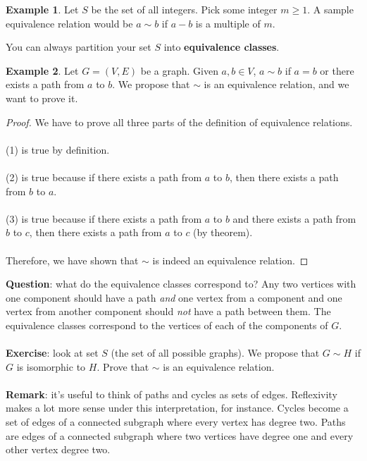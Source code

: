 \documentclass[]{article}
\theoremstyle{definition}
\newtheorem{ex}{Example}[section]
\begin{document}
				\begin{ex}
					Let $S$ be the set of all integers. Pick some integer $m \ge 1$. A sample equivalence relation would be $a \sim b$ if $a - b$ is a multiple of $m$.
				\end{ex}

				You can always partition your set $S$ into \textbf{equivalence classes}.

				\begin{ex}
					Let $G = (V, E)$ be a graph. Given $a, b \in V$, $a \sim b$ if $a = b$ or there exists a path from $a$ to $b$. We propose that $\sim$ is an equivalence relation, and we want to prove it.
					\begin{proof}
						We have to prove all three parts of the definition of equivalence relations.
						\\ \\
						(1) is true by definition.
						\\ \\
						(2) is true because if there exists a path from $a$ to $b$, then there exists a path from $b$ to $a$.
						\\ \\
						(3) is true because if there exists a path from $a$ to $b$ and there exists a path from $b$ to $c$, then there exists a path from $a$ to $c$ (by theorem).
						\\ \\
						Therefore, we have shown that $\sim$ is indeed an equivalence relation.
					\end{proof}
				\end{ex}

				\textbf{Question}: what do the equivalence classes correspond to? Any two vertices with one component should have a path \emph{and} one vertex from a component and one vertex from another component should \emph{not} have a path between them. The equivalence classes correspond to the vertices of each of the components of $G$.
				\\ \\
				\textbf{Exercise}: look at set $S$ (the set of all possible graphs). We propose that $G \sim H$ if $G$ is isomorphic to $H$. Prove that $\sim$ is an equivalence relation.
				\\ \\
				\textbf{Remark}: it's useful to think of paths and cycles as sets of edges. Reflexivity makes a lot more sense under this interpretation, for instance. Cycles become a set of edges of a connected subgraph where every vertex has degree two. Paths are edges of a connected subgraph where two vertices have degree one and every other vertex degree two.
\end{document}
